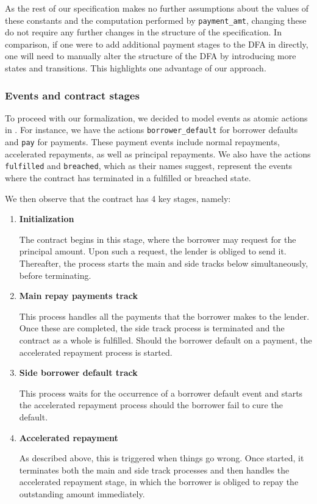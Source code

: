 \documentclass{article}
\begin{document}
As the rest of our specification makes no further assumptions about the values
of these constants and the computation performed by \texttt{payment\_amt},
changing these do not require any further changes in the structure of the 
specification.
In comparison, if one were to add additional payment stages to the DFA in
\cite{contract_as_automaton} directly, one will need to manually alter the
structure of the DFA by introducing more states and transitions.
This highlights one advantage of our approach.

\subsubsection{Events and contract stages}

To proceed with our formalization, we decided to model events as atomic
actions in \mcrl.
For instance, we have the actions \texttt{borrower\_default} for borrower
defaults and \texttt{pay} for payments.
These payment events include normal repayments, accelerated repayments,
as well as principal repayments.
We also have the actions \texttt{fulfilled} and \texttt{breached}, which as
their names suggest, represent the events where the contract has terminated
in a fulfilled or breached state.

We then observe that the contract has 4 key stages, namely:

\begin{enumerate}
  \item \textbf{Initialization}
  
  The contract begins in this stage, where the borrower may
  request for the principal amount.
  Upon such a request, the lender is obliged to send it.
  Thereafter, the process starts the main and side tracks below simultaneously,
  before terminating.

  \item \textbf{Main repay payments track}

  This process handles all the payments that the borrower makes to the lender.
  Once these are completed, the side track process is
  terminated and the contract as a whole is fulfilled.
  Should the borrower default on a payment, the accelerated repayment process
  is started.

  \item \textbf{Side borrower default track}

  This process waits for the occurrence of a borrower default event and starts
  the accelerated repayment process should the borrower fail to cure the
  default.

  \item \textbf{Accelerated repayment}

  As described above, this is triggered when things go wrong.
  Once started, it terminates both the main and side track processes and then
  handles the accelerated repayment stage, in which the borrower is obliged to
  repay the outstanding amount immediately.
\end{enumerate}
\end{document}
